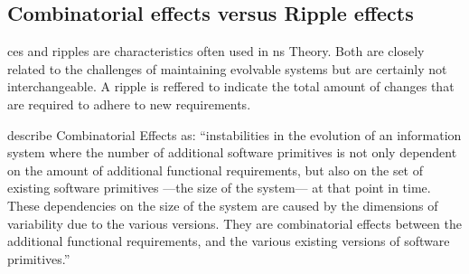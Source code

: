 \subsection{Combinatorial effects versus Ripple effects} \label{subsec_ripple_effect}

\glspl{ce} and \glspl{ripple} are characteristics often used in \gls{ns} Theory. Both are
closely related to the challenges of maintaining evolvable systems but are certainly not
interchangeable. A \gls{ripple} is reffered to indicate the total amount of changes that
are required to adhere to new requirements. 

\textcite[271-272]{mannaert_normalized_2016} describe Combinatorial Effects as:
\enquote{instabilities in the evolution of an information system where the number of
additional software primitives is not only dependent on the amount of additional
functional requirements, but also on the set of existing software primitives —the size of
the system— at that point in time. These dependencies on the size of the system are caused
by the dimensions of variability due to the various versions. They are combinatorial
effects between the additional functional requirements, and the various existing versions
of software primitives.}
